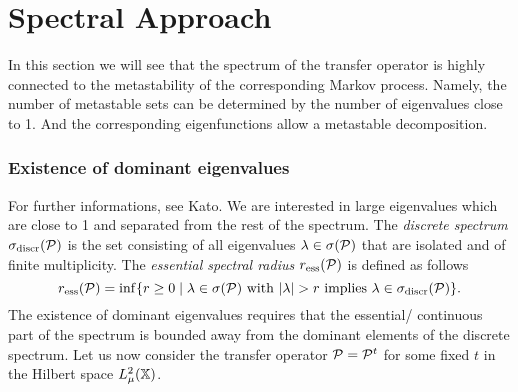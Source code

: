 \section{Spectral Approach}
In this section we will see that the spectrum of the transfer operator is highly connected to the metastability of the corresponding Markov process.
Namely, the number of metastable sets can be determined by the number of eigenvalues close to 1.
And the corresponding eigenfunctions allow a metastable decomposition. 




\subsubsection*{Existence of dominant eigenvalues}


For further informations, see Kato\cite{kato1995}.
We are interested in large eigenvalues which are close to 1 and separated from the rest of the spectrum.
The \textit{discrete spectrum} $\sigma_{\mathrm{discr}}(\mathcal{P})$ is the set consisting of all eigenvalues $\lambda \in \sigma(\mathcal{P})$ that are isolated and of finite multiplicity.
The  \textit{essential spectral radius} $r_{\mathrm{ess}}(\mathcal{P})$ is defined as follows
\begin{equation*}
r_{\mathrm{ess}}(\mathcal{P}) = \inf \{ r \geq 0 \mid \lambda \in \sigma(\mathcal{P}) \textrm{ with } |\lambda| > r \textrm{ implies } \lambda \in \sigma_{\mathrm{discr}}(\mathcal{P}) \}.
\end{equation*}
The existence of dominant eigenvalues requires that the essential/ continuous part of the spectrum is bounded away from the dominant elements of the discrete spectrum.
Let us now consider the transfer operator $\mathcal{P} = \mathcal{P}^t$ for some fixed $t$ in the Hilbert space $L_\mu^2(\mathbb{X})$. 

